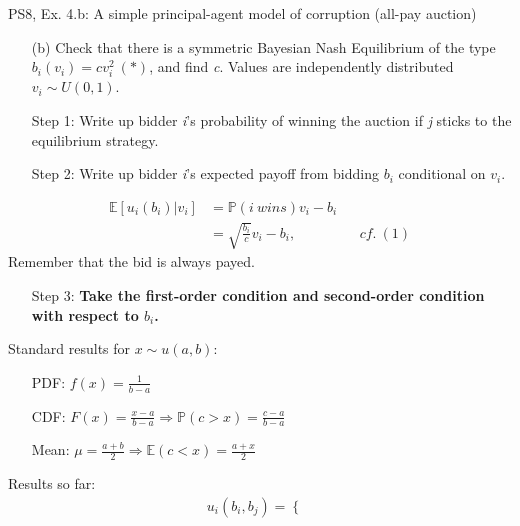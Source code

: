 \begin{frame}{PS8, Ex. 4.b: A simple principal-agent model of corruption (all-pay auction)}
    \begin{itemize}
      \item[(b)] Check that there is a symmetric Bayesian Nash Equilibrium of the type $b_i(v_i) = cv_i^2\ (*)$, and find \textit{c}. Values are independently distributed $v_i\sim U(0, 1)$.
    \end{itemize} \vspace{-8pt}
    \begin{multicols}{2}
      \begin{itemize}
        \item[Step 1:] Write up bidder \textit{i}'s probability of winning the auction if \textit{j} sticks to the equilibrium strategy.
        \item[Step 2:] Write up bidder \textit{i}'s expected payoff from bidding $b_i$ conditional on $v_i$.
      \end{itemize} \vspace{-8pt}
      \begin{align*}
        \mathbb{E}[u_i(b_i)|v_i]&=\mathbb{P}(i\ wins)v_i-b_i\\
                           &=\sqrt{\frac{b_i}{c}}v_i-b_i,&&cf.\ (1)
      \end{align*} \vspace{-8pt}
      Remember that the bid is always payed. \vspace{4pt}
      \begin{itemize}
        \item[Step 3:] \textbf{Take the first-order condition and second-order condition with respect to $b_i$.}
      \end{itemize}
      \vfill\null\columnbreak
      Standard results for $x\sim u(a, b):$ \vspace{-6pt}
      \begin{itemize}
        \item[PDF:] $f(x)=\frac{1}{b-a}$
        \item[CDF:] $F(x)=\frac{x-a}{b-a}\Rightarrow\mathbb{P}(c>x)=\frac{c-a}{b-a}$
        \item[Mean:] $\mu=\frac{a+b}{2}\Rightarrow\mathbb{E}(c<x)=\frac{a+x}{2}$
      \end{itemize}
      \vspace{-6pt}
      Results so far: \vspace{-6pt}
      \begin{align*}
        u_i(b_i,b_j)=\left\{\begin{array}{lcl}

\end{array}
\end{align*}
\end{multicols}
\end{frame}
